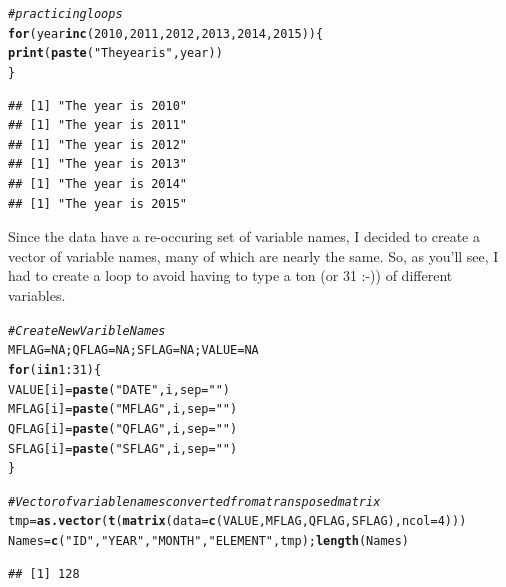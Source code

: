 \documentclass{article}\usepackage[]{graphicx}\usepackage[]{color}
\makeatletter
\newcommand{\hlnum}[1]{\textcolor[rgb]{0.686,0.059,0.569}{#1}}%
\newcommand{\hlstr}[1]{\textcolor[rgb]{0.192,0.494,0.8}{#1}}%
\newcommand{\hlcom}[1]{\textcolor[rgb]{0.678,0.584,0.686}{\textit{#1}}}%
\newcommand{\hlopt}[1]{\textcolor[rgb]{0,0,0}{#1}}%
\newcommand{\hlstd}[1]{\textcolor[rgb]{0.345,0.345,0.345}{#1}}%
\newcommand{\hlkwa}[1]{\textcolor[rgb]{0.161,0.373,0.58}{\textbf{#1}}}%
\newcommand{\hlkwb}[1]{\textcolor[rgb]{0.69,0.353,0.396}{#1}}%
\newcommand{\hlkwc}[1]{\textcolor[rgb]{0.333,0.667,0.333}{#1}}%
\newcommand{\hlkwd}[1]{\textcolor[rgb]{0.737,0.353,0.396}{\textbf{#1}}}%
\newenvironment{kframe}{%
 \def\at@end@of@kframe{}%
 \ifinner\ifhmode%
  \def\at@end@of@kframe{\end{minipage}}%
  \begin{minipage}{\columnwidth}%
 \fi\fi%
 \def\FrameCommand##1{\hskip\@totalleftmargin \hskip-\fboxsep
 \colorbox{shadecolor}{##1}\hskip-\fboxsep
     \hskip-\linewidth \hskip-\@totalleftmargin \hskip\columnwidth}%
 \MakeFramed {\advance\hsize-\width
   \@totalleftmargin\z@ \linewidth\hsize
   \@setminipage}}%
 {\par\unskip\endMakeFramed%
 \at@end@of@kframe}
\newenvironment{knitrout}{}{} %
\makeatother
\begin{document}
\begin{knitrout}
\color{fgcolor}\begin{kframe}
\begin{alltt}
\hlcom{# practicing loops}
\hlkwa{for} \hlstd{(year} \hlkwa{in} \hlkwd{c}\hlstd{(}\hlnum{2010}\hlstd{,}\hlnum{2011}\hlstd{,}\hlnum{2012}\hlstd{,}\hlnum{2013}\hlstd{,}\hlnum{2014}\hlstd{,}\hlnum{2015}\hlstd{))\{}
  \hlkwd{print}\hlstd{(}\hlkwd{paste}\hlstd{(}\hlstr{"The year is"}\hlstd{, year))}
\hlstd{\}}
\end{alltt}
\begin{verbatim}
## [1] "The year is 2010"
## [1] "The year is 2011"
## [1] "The year is 2012"
## [1] "The year is 2013"
## [1] "The year is 2014"
## [1] "The year is 2015"
\end{verbatim}
\end{kframe}
\end{knitrout}

Since the data have a re-occuring set of variable names, I decided to create a vector of variable names, many of which are nearly the same. So, as you'll see, I had to create a loop to avoid having to type a ton (or 31 :-)) of different variables.
\begin{knitrout}
\color{fgcolor}\begin{kframe}
\begin{alltt}
\hlcom{# Create New Varible Names}
\hlstd{MFLAG}\hlkwb{=}\hlnum{NA}\hlstd{; QFLAG}\hlkwb{=}\hlnum{NA}\hlstd{; SFLAG}\hlkwb{=}\hlnum{NA}\hlstd{; VALUE}\hlkwb{=}\hlnum{NA}
\hlkwa{for} \hlstd{(i} \hlkwa{in} \hlnum{1}\hlopt{:}\hlnum{31}\hlstd{)\{}
\hlstd{VALUE[i]} \hlkwb{=} \hlkwd{paste}\hlstd{(}\hlstr{"DATE"}\hlstd{, i,} \hlkwc{sep}\hlstd{=}\hlstr{""}\hlstd{)}
\hlstd{MFLAG[i]} \hlkwb{=} \hlkwd{paste}\hlstd{(}\hlstr{"MFLAG"}\hlstd{, i,} \hlkwc{sep}\hlstd{=}\hlstr{""}\hlstd{)}
\hlstd{QFLAG[i]} \hlkwb{=} \hlkwd{paste}\hlstd{(}\hlstr{"QFLAG"}\hlstd{, i,} \hlkwc{sep}\hlstd{=}\hlstr{""}\hlstd{)}
\hlstd{SFLAG[i]} \hlkwb{=} \hlkwd{paste}\hlstd{(}\hlstr{"SFLAG"}\hlstd{, i,} \hlkwc{sep}\hlstd{=}\hlstr{""}\hlstd{)}
\hlstd{\}}

\hlcom{# Vector of variable names converted from a transposed matrix}
\hlstd{tmp} \hlkwb{=} \hlkwd{as.vector}\hlstd{(}\hlkwd{t}\hlstd{(}\hlkwd{matrix}\hlstd{(}\hlkwc{data}\hlstd{=}\hlkwd{c}\hlstd{(VALUE, MFLAG, QFLAG, SFLAG),} \hlkwc{ncol}\hlstd{=}\hlnum{4}\hlstd{)))}
\hlstd{Names} \hlkwb{=} \hlkwd{c}\hlstd{(}\hlstr{"ID"}\hlstd{,} \hlstr{"YEAR"}\hlstd{,} \hlstr{"MONTH"}\hlstd{,} \hlstr{"ELEMENT"}\hlstd{, tmp);} \hlkwd{length}\hlstd{(Names)}
\end{alltt}
\begin{verbatim}
## [1] 128
\end{verbatim}
\end{kframe}
\end{knitrout}
\end{document}
